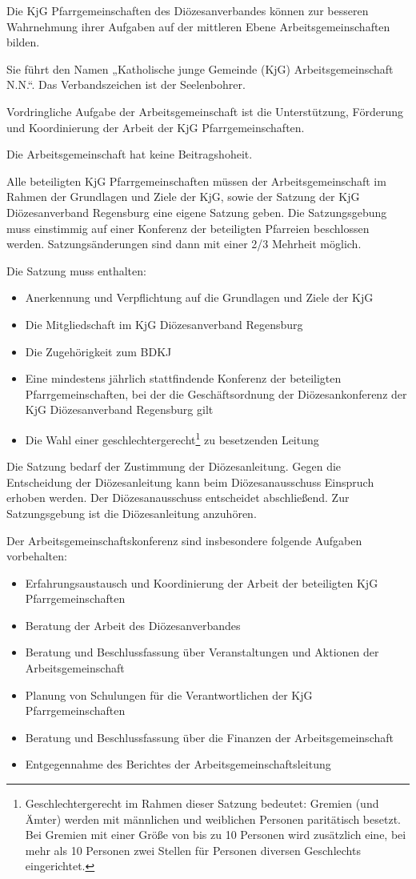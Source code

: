 \documentclass[12pt]{report}
\begin{document}
\begin{justify}
Die KjG Pfarrgemeinschaften des Diözesanverbandes können zur besseren Wahrnehmung ihrer
Aufgaben auf der mittleren Ebene Arbeitsgemeinschaften bilden.

Sie führt den Namen „Katholische junge Gemeinde (KjG) Arbeitsgemeinschaft N.N.“.
Das Verbandszeichen ist der Seelenbohrer.

Vordringliche Aufgabe der Arbeitsgemeinschaft ist die Unterstützung, Förderung und Koordinierung
der Arbeit der KjG Pfarrgemeinschaften.

Die Arbeitsgemeinschaft hat keine Beitragshoheit.

Alle beteiligten KjG Pfarrgemeinschaften müssen der Arbeitsgemeinschaft im Rahmen der Grundlagen
und Ziele der KjG, sowie der Satzung der KjG Diözesanverband Regensburg eine eigene
Satzung geben. Die Satzungsgebung muss einstimmig auf einer Konferenz der beteiligten Pfarreien
beschlossen werden. Satzungsänderungen sind dann mit einer 2/3 Mehrheit möglich.

Die Satzung muss enthalten:
\begin{itemize}
  \item Anerkennung und Verpflichtung auf die Grundlagen und Ziele der KjG
  \item Die Mitgliedschaft im KjG Diözesanverband Regensburg
  \item Die Zugehörigkeit zum BDKJ
  \item Eine mindestens jährlich stattfindende Konferenz der beteiligten Pfarrgemeinschaften, bei der
        die Geschäftsordnung der Diözesankonferenz der KjG Diözesanverband Regensburg gilt
  \item Die Wahl einer geschlechtergerecht\footnote{Geschlechtergerecht im Rahmen dieser Satzung bedeutet: Gremien (und Ämter) werden mit männlichen und
weiblichen Personen paritätisch besetzt. Bei Gremien mit einer Größe von bis zu 10 Personen wird zusätzlich
eine, bei mehr als 10 Personen zwei Stellen für Personen diversen Geschlechts eingerichtet.} zu besetzenden Leitung
\end{itemize}

Die Satzung bedarf der Zustimmung der Diözesanleitung. Gegen die Entscheidung der Diözesanleitung
kann beim Diözesanausschuss Einspruch erhoben werden. Der Diözesanausschuss entscheidet
abschließend. Zur Satzungsgebung ist die Diözesanleitung
anzuhören.

Der Arbeitsgemeinschaftskonferenz sind insbesondere folgende Aufgaben vorbehalten:
\begin{itemize}
  \item Erfahrungsaustausch und Koordinierung der Arbeit der beteiligten KjG Pfarrgemeinschaften
  \item Beratung der Arbeit des Diözesanverbandes
  \item Beratung und Beschlussfassung über Veranstaltungen und Aktionen der Arbeitsgemeinschaft
  \item Planung von Schulungen für die Verantwortlichen der KjG Pfarrgemeinschaften
  \item Beratung und Beschlussfassung über die Finanzen der Arbeitsgemeinschaft
  \item Entgegennahme des Berichtes der Arbeitsgemeinschaftsleitung
\end{itemize}

\end{justify}
\end{document}
